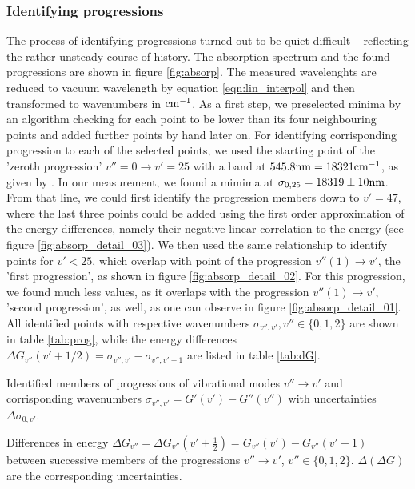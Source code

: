 \subsubsection{Identifying progressions}
The process of identifying progressions turned out to be quiet difficult – reflecting the 
rather unsteady course of history. 
The absorption spectrum and the found progressions are shown in figure \ref{fig:absorp}.
The measured wavelenghts are reduced to vacuum wavelength by equation \eqref{eqn:lin_interpol} 
and then transformed to wavenumbers in $\mathrm{cm^{-1}}$. 
As a first step, we preselected minima by an algorithm checking for each point to be lower than 
its four neighbouring points and added further points by hand later on. For identifying corrisponding 
progression to each of the selected points, we used the starting point of the 'zeroth progression' 
$v'' = 0  \rightarrow v' = 25$ with a band at $545.8 \mathrm{nm} = 18321 \mathrm{cm^{-1}}$, as given by \cite{}. In our 
measurement, we found a mimima at $\sigma_{0, 25} = 18319 \pm 10\mathrm{nm}$. From that line, we could first 
identify the progression members down to $v' = 47$, where the last three points could be added using 
the first order approximation of the energy differences, namely their negative linear correlation 
to the energy (see figure \ref{fig:absorp_detail_03}). We then used the same relationship to identify 
points for $v' < 25$, which overlap with point of the progression $v''(1) \rightarrow v'$, the 
'first progression', 
as shown in figure \ref{fig:absorp_detail_02}. For this progression, we found much less values, as 
it overlaps with the progression $v''(1) \rightarrow v'$, 'second progression', as well, as one can 
observe in figure \ref{fig:absorp_detail_01}. All identified points with respective wavenumbers 
$\sigma_{v'', v'}, v'' \in \{0, 1, 2\}$ are shown in table \ref{tab:prog}, 
while the energy differences $\Delta G_{v''}(v' + 1 / 2) = \sigma_{v'', v'} - \sigma_{v'', v' + 1}$ are 
listed in table \ref{tab:dG}.

\begin{table}[h]
\centering
\small

\caption{Identified members of progressions of vibrational modes $v'' \rightarrow v'$ 
and corrisponding wavenumbers $\sigma_{v'', v'} = G'(v') - G''(v'')$ with uncertainties
$\Delta \sigma_{0, v'}$. }
\label{tab:prog}
\end{table}

\begin{table}[h]
\centering
\small

\caption{Differences in energy 
$\Delta G_{v''} = \Delta G_{v''} (v' + \frac{1}{2}) = G_{v''}(v') - G_{v''}(v' + 1)$ 
between successive members of the progressions $v'' \rightarrow v'$, $v'' \in \{0, 1, 2\}$. 
$ \Delta (\Delta G) $ are the corresponding uncertainties. 
 }
\label{tab:dG}
\end{table}

